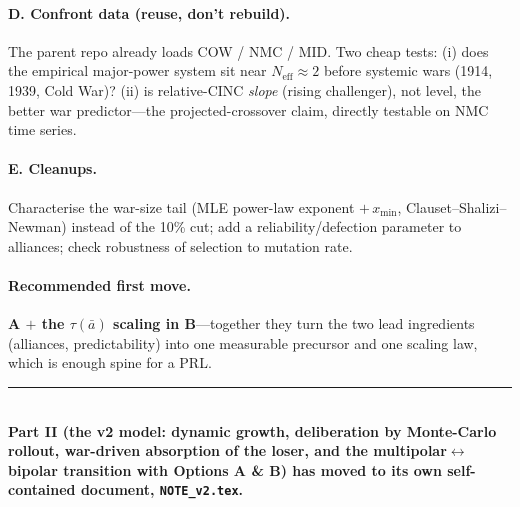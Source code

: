 \documentclass[11pt]{article}
\newcommand{\Neff}{N_{\mathrm{eff}}}
\newcommand{\abar}{\bar a}
\begin{document}
\paragraph{D. Confront data (reuse, don't rebuild).} The parent repo already
loads COW / NMC / MID. Two cheap tests: (i) does the empirical major-power system
sit near $\Neff\approx2$ before systemic wars (1914, 1939, Cold War)? (ii) is
relative-CINC \emph{slope} (rising challenger), not level, the better war
predictor---the projected-crossover claim, directly testable on NMC time series.

\paragraph{E. Cleanups.} Characterise the war-size tail (MLE power-law exponent
$+\,x_{\min}$, Clauset--Shalizi--Newman) instead of the 10\% cut; add a
reliability/defection parameter to alliances; check robustness of selection to
mutation rate.

\paragraph{Recommended first move.} \textbf{A $+$ the $\tau(\abar)$ scaling in
B}---together they turn the two lead ingredients (alliances, predictability) into
one measurable precursor and one scaling law, which is enough spine for a PRL.

\bigskip
\noindent\rule{\linewidth}{0.4pt}\\[2pt]
\noindent\textbf{Part II (the v2 model: dynamic growth, deliberation by
Monte-Carlo rollout, war-driven absorption of the loser, and the
multipolar$\leftrightarrow$bipolar transition with Options A \& B) has moved to its
own self-contained document, \texttt{NOTE\_v2.tex}.}
\end{document}
